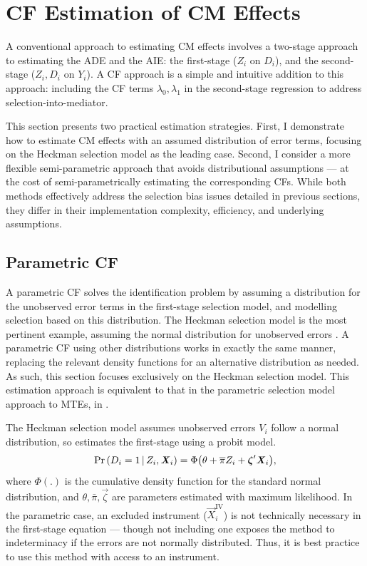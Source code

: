 \section{CF Estimation of CM Effects}
\label{sec:controlfun}
A conventional approach to estimating CM effects involves a two-stage approach to estimating the ADE and the AIE: the first-stage ($Z_i$ on $D_i$), and the second-stage ($Z_i, D_i$ on $Y_i$).
A CF approach is a simple and intuitive addition to this approach: including the CF terms $\lambda_0, \lambda_1$ in the second-stage regression to address selection-into-mediator.

This section presents two practical estimation strategies.
First, I demonstrate how to estimate CM effects with an assumed distribution of error terms, focusing on the Heckman selection model as the leading case.
Second, I consider a more flexible semi-parametric approach that avoids distributional assumptions --- at the cost of semi-parametrically estimating the corresponding CFs.
While both methods effectively address the selection bias issues detailed in previous sections, they differ in their implementation complexity, efficiency, and underlying assumptions.

\subsection{Parametric CF}
A parametric CF solves the identification problem by assuming a distribution for the unobserved error terms in the first-stage selection model, and modelling selection based on this distribution.
The Heckman selection model is the most pertinent example, assuming the normal distribution for unobserved errors \citep{heckman1979sample}.
A parametric CF using other distributions works in exactly the same manner, replacing the relevant density functions for an alternative distribution as needed.
As such, this section focuses exclusively on the Heckman selection model.
This estimation approach is equivalent to that in the parametric selection model approach to MTEs, in \cite{bjorklund1987estimation}.

The Heckman selection model assumes unobserved errors $V_i$ follow a normal distribution, so estimates the first-stage using a probit model.
\[ \Pr\left( D_i = 1 \, \middle\vert \, Z_i, \boldsymbol{\mathit{X}}_i \right)
    = \Phi \big( \theta + \overline{\pi} Z_i + \boldsymbol{\mathit{\zeta}}' \boldsymbol{\mathit{X}}_i \big), \]
where $\Phi(.)$ is the cumulative density function for the standard normal distribution, and $\theta, \bar\pi, \vec\zeta$ are parameters estimated with maximum likelihood.
In the parametric case, an excluded instrument ($\vec X_i^{\text{IV}}$) is not technically necessary in the first-stage equation --- though not including one exposes the method to indeterminacy if the errors are not normally distributed.
Thus, it is best practice to use this method with access to an instrument.

